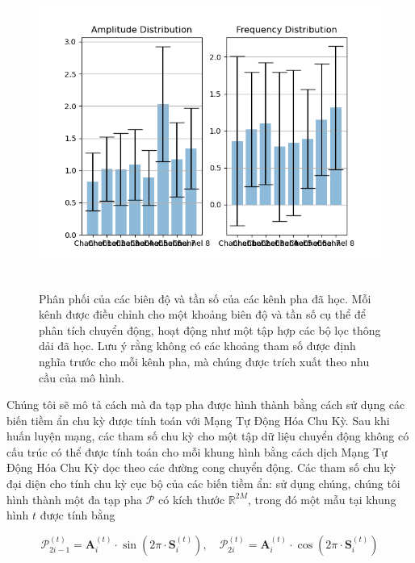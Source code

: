 \begin{figure}
	\centering
	\includegraphics[height=10cm,width=\linewidth]{images/distribution.png}
	\caption{Phân phối của các biên độ và tần số của các kênh pha đã học. Mỗi kênh được điều chỉnh cho một khoảng biên độ và tần số cụ thể để phân tích chuyển động, hoạt động như một tập hợp các bộ lọc thông dải đã học. Lưu ý rằng không có các khoảng tham số được định nghĩa trước cho mỗi kênh pha, mà chúng được trích xuất theo nhu cầu của mô hình.}
	\label{fig:distribution}
\end{figure}

Chúng tôi sẽ mô tả cách mà đa tạp pha được hình thành bằng cách sử dụng các biến tiềm ẩn chu kỳ được tính toán với Mạng Tự Động Hóa Chu Kỳ. Sau khi huấn luyện mạng, các tham số chu kỳ cho một tập dữ liệu chuyển động không có cấu trúc có thể được tính toán cho mỗi khung hình bằng cách dịch Mạng Tự Động Hóa Chu Kỳ dọc theo các đường cong chuyển động. Các tham số chu kỳ đại diện cho tính chu kỳ cục bộ của các biến tiềm ẩn: sử dụng chúng, chúng tôi hình thành một đa tạp pha $\mathcal{P}$ có kích thước $\mathbb{R}^{2M}$, trong đó một mẫu tại khung hình $t$ được tính bằng

\begin{equation}
	\label{eq:phase_define}
	\mathcal{P}^{(t)}_{2i-1} = \textbf{A}^{(t)}_i \cdot \sin(2\pi \cdot \textbf{S}^{(t)}_i), \quad \mathcal{P}^{(t)}_{2i} = \textbf{A}^{(t)}_i \cdot \cos(2\pi \cdot \textbf{S}^{(t)}_i)
\end{equation}


